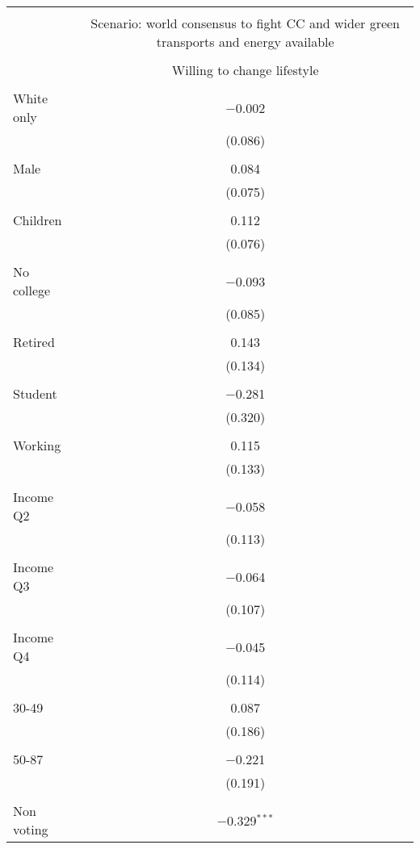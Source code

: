 
\begin{tabular}{@{\extracolsep{5pt}}lc} 
\\[-1.8ex]\hline 
\hline \\[-1.8ex] 
 & \multicolumn{1}{c}{Scenario: world consensus to fight CC and wider green transports and energy available} \\ 
\cline{2-2} 
\\[-1.8ex] & Willing to change lifestyle \\ 
\hline \\[-1.8ex] 
 White only & $-$0.002 \\ 
  & (0.086) \\ 
  & \\ 
 Male & 0.084 \\ 
  & (0.075) \\ 
  & \\ 
 Children & 0.112 \\ 
  & (0.076) \\ 
  & \\ 
 No college & $-$0.093 \\ 
  & (0.085) \\ 
  & \\ 
 Retired & 0.143 \\ 
  & (0.134) \\ 
  & \\ 
 Student & $-$0.281 \\ 
  & (0.320) \\ 
  & \\ 
 Working & 0.115 \\ 
  & (0.133) \\ 
  & \\ 
 Income Q2 & $-$0.058 \\ 
  & (0.113) \\ 
  & \\ 
 Income Q3 & $-$0.064 \\ 
  & (0.107) \\ 
  & \\ 
 Income Q4 & $-$0.045 \\ 
  & (0.114) \\ 
  & \\ 
 30-49 & 0.087 \\ 
  & (0.186) \\ 
  & \\ 
 50-87 & $-$0.221 \\ 
  & (0.191) \\ 
  & \\ 
 Non voting & $-$0.329$^{***}$ \\ 

\end{tabular}
